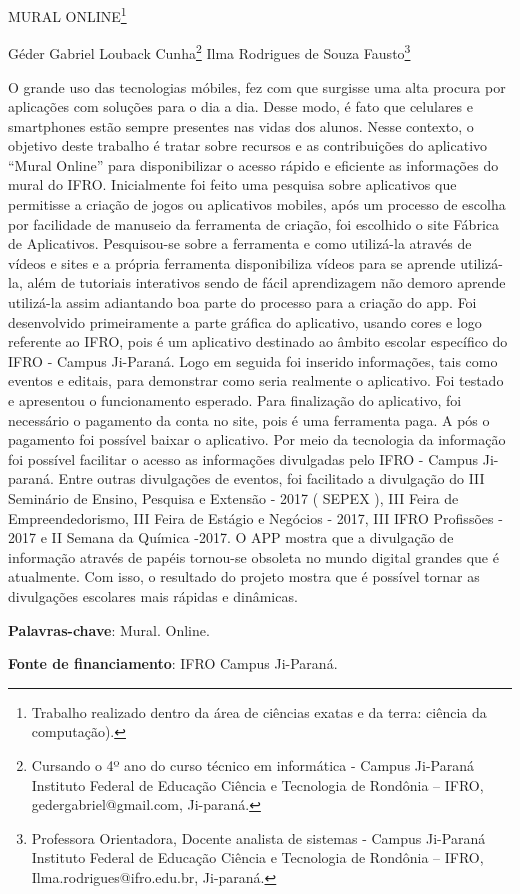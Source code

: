 \documentclass[article,12pt,onesidea,4paper,english,brazil]{abntex2}
\begin{document}
	
	
	\frenchspacing 
	
	\begin{center}
		\LARGE MURAL ONLINE\footnote{ Trabalho realizado dentro da área de ciências exatas e da terra: ciência da computação).}
		
		\normalsize
	Géder Gabriel Louback Cunha\footnote{Cursando o 4º ano do curso técnico em informática - Campus Ji-Paraná Instituto Federal de
		Educação Ciência e Tecnologia de Rondônia – IFRO, gedergabriel@gmail.com, Ji-paraná.} 
	Ilma Rodrigues de Souza Fausto\footnote{Professora Orientadora, Docente analista de sistemas - Campus Ji-Paraná Instituto Federal
		de Educação Ciência e Tecnologia de Rondônia – IFRO, Ilma.rodrigues@ifro.edu.br, Ji-paraná.} 
	\end{center}
	
	\noindent O grande uso das tecnologias móbiles, fez com que surgisse uma alta procura por
	aplicações com soluções para o dia a dia. Desse modo, é fato que celulares e
	smartphones estão sempre presentes nas vidas dos alunos. Nesse contexto, o objetivo
	deste trabalho é tratar sobre recursos e as contribuições do aplicativo “Mural Online”
	para disponibilizar o acesso rápido e eficiente as informações do mural do IFRO.
	Inicialmente foi feito uma pesquisa sobre aplicativos que permitisse a criação de jogos
	ou aplicativos mobiles, após um processo de escolha por facilidade de manuseio da
	ferramenta de criação, foi escolhido o site Fábrica de Aplicativos. Pesquisou-se sobre a
	ferramenta e como utilizá-la através de vídeos e sites e a própria ferramenta
	disponibiliza vídeos para se aprende utilizá-la, além de tutoriais interativos sendo de
	fácil aprendizagem não demoro aprende utilizá-la assim adiantando boa parte do
	processo para a criação do app. Foi desenvolvido primeiramente a parte gráfica do
	aplicativo, usando cores e logo referente ao IFRO, pois é um aplicativo destinado ao
	âmbito escolar específico do IFRO - Campus Ji-Paraná. Logo em seguida foi inserido
	informações, tais como eventos e editais, para demonstrar como seria realmente o
	aplicativo. Foi testado e apresentou o funcionamento esperado. Para finalização do
	aplicativo, foi necessário o pagamento da conta no site, pois é uma ferramenta paga. A
	pós o pagamento foi possível baixar o aplicativo. Por meio da tecnologia da informação
	foi possível facilitar o acesso as informações divulgadas pelo IFRO - Campus Ji-paraná.
	Entre outras divulgações de eventos, foi facilitado a divulgação do III Seminário de
	Ensino, Pesquisa e Extensão - 2017 ( SEPEX ), III Feira de Empreendedorismo, III
	Feira de Estágio e Negócios - 2017, III IFRO Profissões - 2017 e II Semana da Química
	-2017. O APP mostra que a divulgação de informação através de papéis tornou-se
	obsoleta no mundo digital grandes que é atualmente. Com isso, o resultado do projeto
	mostra que é possível tornar as divulgações escolares mais rápidas e dinâmicas.
	
	\vspace{\onelineskip}
	
	\noindent
	\textbf{Palavras-chave}: Mural. Online.
	
		\noindent
	\textbf{Fonte de financiamento}: IFRO Campus Ji-Paraná.
	
\end{document}
